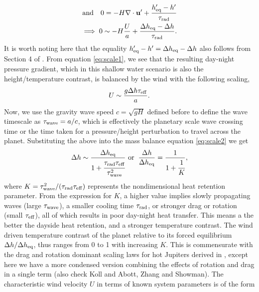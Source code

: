 \documentclass[trackchanges,twocolumn]{aastex7}
\begin{document}
\begin{align}
   \text{and} \quad 0 = -H \nabla \cdot \mathbf{u}' + \frac{h'_{\rm eq} - h'}{\tau_{\rm rad}} \nonumber\\ \implies 0 \sim -H \frac{U}{a} + \frac{\Delta h_{\rm eq} - \Delta h}{\tau_{\rm rad}}.
    \label{eq:scale2}
\end{align}
It is worth noting here that the equality $h'_{\rm eq} - h'=\Delta h_{\rm eq} - \Delta h$ also follows from Section 4 of \cite{perez2013atmospheric}. From equation \eqref{eq:scale1}, we see that the resulting day-night pressure gradient, which in this shallow water scenario is also the height/temperature contrast, is balanced by the wind with the following scaling,
\begin{equation}
    U \sim \frac{g \Delta h \tau_{\rm eff}}{a}.
\end{equation}
Now, we use the gravity wave speed $c = \sqrt{gH}$ defined before to define the wave timescale as $\tau_{\rm wave} = a/c$, which is effectively the planetary scale wave crossing time or the time taken for a pressure/height perturbation to travel across the planet. Substituting the above into the mass balance equation \eqref{eq:scale2} we get
\begin{equation}
    \Delta h \sim \frac{\Delta h_{\rm eq}}{1 + \cfrac{\tau_{\rm rad} \tau_{\rm eff}}{\tau_{\rm wave}^2}}   
    \text{ or} \hspace{2mm} \frac{\Delta h}{\Delta h_{\rm eq}} = \frac{1}{1+ \cfrac{1}{K}},
    \label{eq:scale3}
\end{equation}
where $K = \tau_{\rm wave}^2 / (\tau_{\rm rad}\tau_{\rm eff})$ represents the nondimensional heat retention parameter. From the expression for $K$, a higher value implies slowly propagating waves (large $\tau_{\rm wave}$), a smaller cooling time $\tau_{\rm rad}$, or stronger drag or rotation (small $\tau_{\rm eff}$), all of which results in poor day-night heat transfer. This means a the better the dayside heat retention, and a stronger temperature contrast. The wind driven temperature contrast of the planet relative to its forced equilibrium ${\Delta h}/\Delta h_{\rm eq}$, thus ranges from 0 to 1 with increasing $K$. This is commensurate with the drag and rotation dominant scaling laws for hot Jupiters derived in \cite{perez2013atmospheric}, except here we have a more condensed version combining the effects of rotation and drag in a single term {\color{red}(also check Koll and Abott, Zhang and Showman)}. The characteristic wind velocity $U$ in terms of known system parameters is of the form
\end{document}
